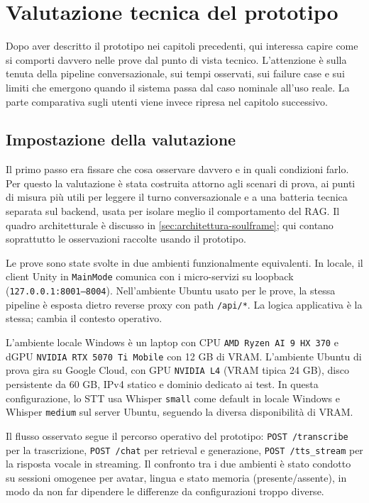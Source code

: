 \chapter{Valutazione tecnica del prototipo}
\label{chap:risultati}

Dopo aver descritto il prototipo nei capitoli precedenti, qui interessa capire come si comporti davvero nelle prove dal punto di vista tecnico. L'attenzione è sulla tenuta della pipeline conversazionale, sui tempi osservati, sui failure case e sui limiti che emergono quando il sistema passa dal caso nominale all'uso reale. La parte comparativa sugli utenti viene invece ripresa nel capitolo successivo.

\section{Impostazione della valutazione}
\label{sec:metodologia}
\noindent Il primo passo era fissare che cosa osservare davvero e in quali condizioni farlo. Per questo la valutazione è stata costruita attorno agli scenari di prova, ai punti di misura più utili per leggere il turno conversazionale e a una batteria tecnica separata sul backend, usata per isolare meglio il comportamento del RAG. Il quadro architetturale è discusso in \autoref{sec:architettura-soulframe}; qui contano soprattutto le osservazioni raccolte usando il prototipo.

Le prove sono state svolte in due ambienti funzionalmente equivalenti. In locale, il client Unity in \texttt{MainMode} comunica con i micro-servizi su loopback (\texttt{127.0.0.1:8001--8004}). Nell'ambiente Ubuntu usato per le prove, la stessa pipeline è esposta dietro reverse proxy con path \texttt{/api/*}. La logica applicativa è la stessa; cambia il contesto operativo.

L'ambiente locale Windows è un laptop con CPU \texttt{AMD Ryzen AI 9 HX 370} e dGPU \texttt{NVIDIA RTX 5070 Ti Mobile} con 12 GB di VRAM. L'ambiente Ubuntu di prova gira su Google Cloud, con GPU \texttt{NVIDIA L4} (VRAM tipica 24 GB), disco persistente da 60 GB, IPv4 statico e dominio dedicato ai test. In questa configurazione, lo STT usa Whisper \texttt{small} come default in locale Windows e Whisper \texttt{medium} sul server Ubuntu, seguendo la diversa disponibilità di VRAM.

Il flusso osservato segue il percorso operativo del prototipo: \texttt{POST /transcribe} per la trascrizione, \texttt{POST /chat} per retrieval e generazione, \texttt{POST /tts\_stream} per la risposta vocale in streaming. Il confronto tra i due ambienti è stato condotto su sessioni omogenee per avatar, lingua e stato memoria (presente/assente), in modo da non far dipendere le differenze da configurazioni troppo diverse.

